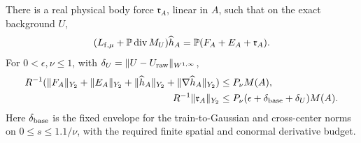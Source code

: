\begin{lemma}\label{ret:physical-affine}
There is a real physical body force $\mathfrak r_A$, linear in $A$,
such that on the exact background $U$,
\[
 (L_{{\rm f},\mu}+\mathbb P\operatorname{div}M_U)\widehat h_A
       =\mathbb P(F_A+E_A+\mathfrak r_A).
\]
For $0<\epsilon,\nu\le1$, with $\delta_U=\|U-U_{\rm raw}\|_{W^{1,\infty}}$,
\begin{equation}\label{ret:general-affine-bounds}
 \begin{split}
 R^{-1}(\|F_A\|_{Y_2}+\|E_A\|_{Y_2}
       +\|\widehat h_A\|_{Y_2}+\|\nabla\widehat h_A\|_{Y_2})
       &\le P_\nu M(A),\\
 R^{-1}\|\mathfrak r_A\|_{Y_2}
       &\le P_\nu(\epsilon+\delta_{\rm base}+\delta_U)M(A).
 \end{split}
\end{equation}
Here $\delta_{\rm base}$ is the fixed envelope for the train-to-Gaussian
and cross-center norms on $0\le s\le1.1/\nu$, with the required
finite spatial and conormal derivative budget.
\end{lemma}
